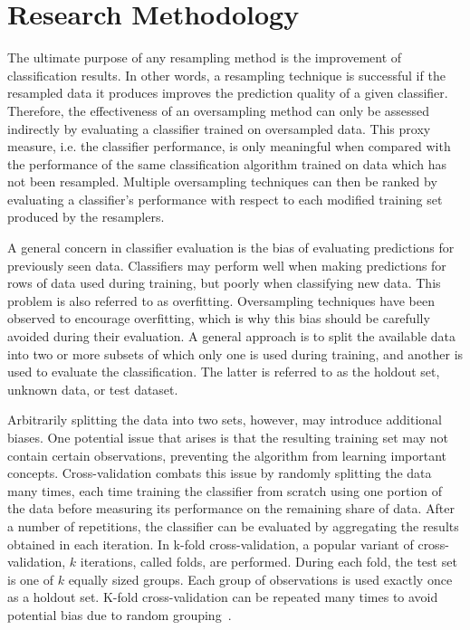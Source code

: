 \documentclass[sort&compress]{elsarticle}
\begin{document}
\section{Research Methodology}
\label{sec:research-methodology}
The ultimate purpose of any resampling method is the improvement of classification results. In other words, a resampling technique is successful if the resampled data it produces improves the prediction quality of a given classifier. Therefore, the effectiveness of an oversampling method can only be assessed indirectly by evaluating a classifier trained on oversampled data. This proxy measure, i.e. the classifier performance, is only meaningful when compared with the performance of the same classification algorithm trained on data which has not been resampled. Multiple oversampling techniques can then be ranked by evaluating a classifier's performance with respect to each modified training set produced by the resamplers.

A general concern in classifier evaluation is the bias of evaluating predictions for previously seen data. Classifiers may perform well when making predictions for rows of data used during training, but poorly when classifying new data. This problem is also referred to as overfitting. Oversampling techniques have been observed to encourage overfitting, which is why this bias should be carefully avoided during their evaluation. A general approach is to split the available data into two or more subsets of which only one is used during training, and another is used to evaluate the classification. The latter is referred to as the holdout set, unknown data, or test dataset. 

Arbitrarily splitting the data into two sets, however, may introduce additional biases. One potential issue that arises is that the resulting training set may not contain certain observations, preventing the algorithm from learning important concepts. Cross-validation combats this issue by randomly splitting the data many times, each time training the classifier from scratch using one portion of the data before measuring its performance on the remaining share of data. After a number of repetitions, the classifier can be evaluated by aggregating the results obtained in each iteration. In k-fold cross-validation, a popular variant of cross-validation, $k$ iterations, called folds, are performed. During each fold, the test set is one of $k$ equally sized groups. Each group of observations is used exactly once as a holdout set. K-fold cross-validation can be repeated many times to avoid potential bias due to random grouping~\citep{Japkowicz.2013}.
\end{document}
